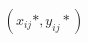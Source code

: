 \documentclass[preview]{standalone}
\begin{document}
\begin{align*}
(x_{ij}*, y_{ij}*)
\end{align*}
\end{document}
